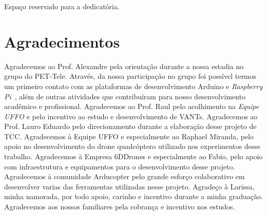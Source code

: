 \documentclass[12pt,a4paper,oneside]{book}
\begin{document}



\begin{flushright}
 \begin{minipage}{0.5\textwidth}
  \vspace{17.0cm} 
  Espaço reservado para a dedicatória.
 \end{minipage}
\end{flushright}






\chapter*{Agradecimentos}

\thispagestyle{myheadings}
%
Agradecemos ao Prof. Alexandre pela orientação durante a nossa estadia no grupo do PET-Tele. Através, 
da nossa participação no grupo foi possível termos um primeiro contato com as plataformas de desenvolvimento 
Arduino e \textit{Raspberry Pi}~\cite{url:raspberrypi}, além de outras atividades que contribuíram para nosso
desenvolvimento acadêmico e profissional.
%
Agradecemos ao Prof. Raul pelo acolhimento na \textit{Equipe UFFO} e pelo incentivo ao estudo e desenvolvimento 
de VANTs. 
%
Agradecemos ao Prof. Lauro Eduardo pelo direcionamento durante a elaboração desse projeto de TCC. 
%
Agradecemos à Equipe UFFO e especialmente ao Raphael Miranda, pelo apoio no desenvolvimento do drone quadcóptero 
utilizado nos experimentos desse trabalho. 
%
Agradecemos à Empresa 6DDrones e especialmente ao Fabio, pelo apoio com infraestrutura e equipamentos para o desenvolvimento 
desse projeto.
%
Agradecemos à comunidade Arducopter pelo grande esforço colaborativo em desenvolver varias das ferramentas utilizadas nesse projeto.
%
Agradeço à Larissa, minha namorada, por todo apoio, carinho e incentivo durante a minha graduação.
%
Agradecemos aos nossos familiares pela cobrança e incentivo nos estudos.
%
\end{document}
